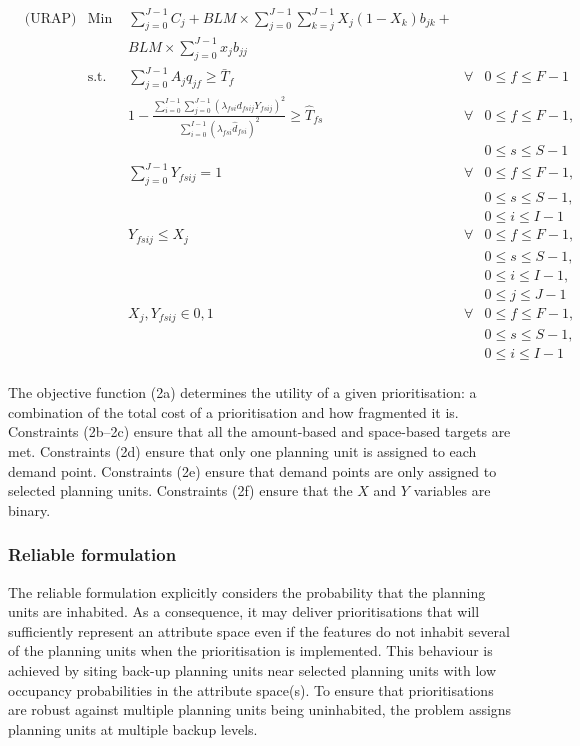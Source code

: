 \documentclass[11pt,]{article}
\begin{document}
\begin{align*}
& \text{(URAP)} & \text{Min } & \sum_{j=0}^{J-1} C_j + BLM \times \sum_{j=0}^{J-1} \sum_{k=j}^{J-1} X_j \left( 1-X_k \right) b_{jk} + & & \tag{2a} \\
& & & BLM \times \sum_{j=0}^{J-1} x_j b_{jj} & & & \\
%
& & \text{s.t. } & \sum_{j=0}^{J-1} A_j q_{jf} \geq \bar{T}_{f} & \forall & 0 \leq f \leq F-1 \tag{2b}\\
%
& & & 1 - \frac{\sum_{i=0}^{I-1} \sum_{j=0}^{J-1} \left( \lambda_{fsi} d_{fsij} Y_{fsij} \right)^2}{\sum_{i=0}^{I-1} \left( \lambda_{fsi} \hat{d}_{fsi} \right)^2 } \geq \hat{T}_{fs}  & \forall & 0 \leq f \leq F-1, \tag{2c}\\
& & & & & 0 \leq s \leq S-1\\
%
& & & \sum_{j=0}^{J-1} Y_{fsij} = 1 & \forall & 0 \leq f \leq F-1, \tag{2d}\\
& & & & & 0 \leq s \leq S-1, \\
& & & & & 0 \leq i \leq I-1\\
%
& & & Y_{fsij} \leq X_j & \forall & 0 \leq f \leq F-1, \tag{2e}\\
& & & & & 0 \leq s \leq S-1, \\
& & & & & 0 \leq i \leq I-1,\\
& & & & & 0 \leq j \leq J-1\\
%
& & & X_j, Y_{fsij} \in {0,1} & \forall & 0 \leq f \leq F-1, \tag{2f}\\
& & & & & 0 \leq s \leq S-1,\\
& & & & & 0 \leq i \leq I-1\\
%
\end{align*}

The objective function (2a) determines the utility of a given
prioritisation: a combination of the total cost of a prioritisation and
how fragmented it is. Constraints (2b--2c) ensure that all the
amount-based and space-based targets are met. Constraints (2d) ensure
that only one planning unit is assigned to each demand point.
Constraints (2e) ensure that demand points are only assigned to selected
planning units. Constraints (2f) ensure that the $X$ and $Y$ variables
are binary.

\subsubsection{Reliable formulation}\label{reliable-formulation}

The reliable formulation explicitly considers the probability that the
planning units are inhabited. As a consequence, it may deliver
prioritisations that will sufficiently represent an attribute space even
if the features do not inhabit several of the planning units when the
prioritisation is implemented. This behaviour is achieved by siting
back-up planning units near selected planning units with low occupancy
probabilities in the attribute space(s). To ensure that prioritisations
are robust against multiple planning units being uninhabited, the
problem assigns planning units at multiple backup levels.
\end{document}
